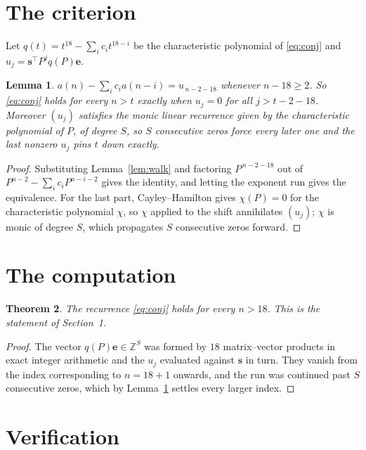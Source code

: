 \documentclass[11pt,a4paper]{article}
\theoremstyle{plain}
\newtheorem{theorem}{Theorem}
\newtheorem{lemma}[theorem]{Lemma}
\theoremstyle{definition}
\begin{document}
\section{The criterion}

Let $q(t)=t^{18}-\sum_i c_i t^{18-i}$ be the characteristic polynomial of
\eqref{eq:conj} and $u_j=\mathbf{s}^{\!\top}P^{j}q(P)\mathbf{e}$.

\begin{lemma}\label{lem:crit}
$a(n)-\sum_i c_i a(n-i)=u_{\,n-2-18}$ whenever $n-18\ge2$. So \eqref{eq:conj}
holds for every $n>t$ exactly when $u_j=0$ for all $j>t-2-18$. Moreover $(u_j)$
satisfies the monic linear recurrence given by the characteristic polynomial of $P$, of
degree $S$, so $S$ consecutive zeros force every later one and the last nonzero $u_j$ pins
$t$ down exactly.
\end{lemma}

\begin{proof}
Substituting Lemma~\ref{lem:walk} and factoring $P^{\,n-2-18}$ out of
$P^{n-2}-\sum_i c_i P^{n-i-2}$ gives the identity, and letting the exponent run gives the
equivalence. For the last part, Cayley--Hamilton gives $\chi(P)=0$ for the characteristic
polynomial $\chi$, so $\chi$ applied to the shift annihilates $(u_j)$; $\chi$ is monic of
degree $S$, which propagates $S$ consecutive zeros forward.
\end{proof}

\section{The computation}

\begin{theorem}
The recurrence \eqref{eq:conj} holds for every $n>18$. This is the statement of
Section~1.
\end{theorem}

\begin{proof}
The vector $q(P)\mathbf{e}\in\mathbb{Z}^{S}$ was formed by $18$ matrix--vector
products in exact integer arithmetic and the $u_j$ evaluated against $\mathbf{s}$ in turn.
They vanish from the index corresponding to $n=18+1$ onwards, and the run was continued
past $S$ consecutive zeros, which by Lemma~\ref{lem:crit} settles every larger index.
\end{proof}

\section{Verification}
\end{document}
